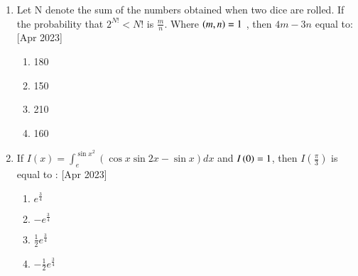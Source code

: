 \documentclass[journal]{IEEEtran}
\begin{document}
\begin{enumerate}
    \item Let N denote the sum of the numbers obtained when two dice are rolled. If the probability that $2^{N!} < N!$ is $\frac{m}{n}$. Where $\left(m,n\right)=1$ , then $4m-3n$ equal to:
     \hfill{[Apr 2023]}
    \begin{multicols}{4}
            \begin{enumerate}
              \item 180
              \item 150
              \item 210
              \item 160
            \end{enumerate}
        \end{multicols}
        \item If $I(x)=\int_ e^{\sin{x}^2} (\cos{x}\sin{2x}-\sin{x}) dx$ and $I\left(0\right)=1$, then $I(\frac{\pi}{3})$ is equal to :
         \hfill{[Apr 2023]}
        \begin{multicols}{4}
            \begin{enumerate}
              \item $e^{\frac{3}{4}}$
              \item $-e^{\frac{3}{4}}$
            \item $\frac{1}{2}e^{\frac{3}{4}}$
              \item $-\frac{1}{2}e^{\frac{3}{4}}$
            \end{enumerate}
        \end{multicols}
 \end{enumerate}
\end{document}
